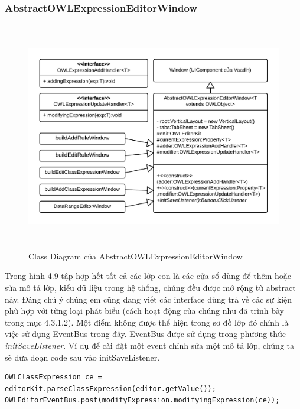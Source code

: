 \subsubsection{AbstractOWLExpressionEditorWindow}
\begin{figure}[h!]
	\centering
	\includegraphics[width=155mm,height=100mm]{Figures/uml_owledtior_abtractwindow.png}
	\caption{Class Diagram của AbstractOWLExpressionEditorWindow\label{overflow}}
\end{figure}
Trong hình 4.9 tập hợp hết tất cả các lớp con là các cửa sổ dùng để thêm hoặc sửa mô tả lớp, kiểu dữ liệu trong hệ thống, chúng đều được mở rộng từ abstract này. Đáng chú ý chúng em cũng đang viết các interface dùng trả về các sự kiện phù hợp với từng loại phát biểu (cách hoạt động của chúng như đã trình bày trong mục 4.3.1.2). Một điểm không được thể hiện trong sơ đồ lớp đó chính là việc sử dụng EventBus trong đây. EventBus được sử dụng trong phương thức \textit{initSaveListener}. Ví dụ để cài đặt một event chỉnh sửa một mô tả lớp, chúng ta sẽ đưa đoạn code sau vào initSaveListener.
\begin{verbatim}
OWLClassExpression ce = editorKit.parseClassExpression(editor.getValue());
OWLEditorEventBus.post(modifyExpression.modifyingExpression(ce));
\end{verbatim}
